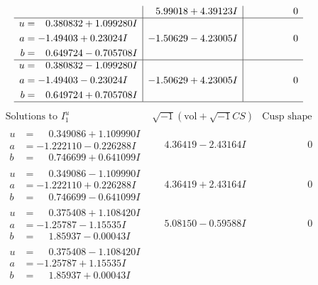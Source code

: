 \documentclass[1p]{elsarticle_modified}
\theoremstyle{definition}
\newcommand{\I}{\sqrt{-1}}
\begin{document}
$$\begin{array}{c|c|c}
 & \phantom{-}5.99018 + 4.39123 I & \phantom{-0.000000 } 0 \\ \hline\begin{aligned}
u &= \phantom{-}0.380832 + 1.099280 I \\
a &= -1.49403 + 0.23024 I \\
b &= \phantom{-}0.649724 - 0.705708 I\end{aligned}
 & -1.50629 - 4.23005 I & \phantom{-0.000000 } 0 \\ \hline\begin{aligned}
u &= \phantom{-}0.380832 - 1.099280 I \\
a &= -1.49403 - 0.23024 I \\
b &= \phantom{-}0.649724 + 0.705708 I\end{aligned}
 & -1.50629 + 4.23005 I & \phantom{-0.000000 } 0\\
 \hline 
 \end{array}$$\newpage$$\begin{array}{c|c|c}  
\text{Solutions to }I^u_{1}& \I (\text{vol} + \sqrt{-1}CS) & \text{Cusp shape}\\
 \hline 
\begin{aligned}
u &= \phantom{-}0.349086 + 1.109990 I \\
a &= -1.222110 - 0.226288 I \\
b &= \phantom{-}0.746699 + 0.641099 I\end{aligned}
 & \phantom{-}4.36419 - 2.43164 I & \phantom{-0.000000 } 0 \\ \hline\begin{aligned}
u &= \phantom{-}0.349086 - 1.109990 I \\
a &= -1.222110 + 0.226288 I \\
b &= \phantom{-}0.746699 - 0.641099 I\end{aligned}
 & \phantom{-}4.36419 + 2.43164 I & \phantom{-0.000000 } 0 \\ \hline\begin{aligned}
u &= \phantom{-}0.375408 + 1.108420 I \\
a &= -1.25787 - 1.15535 I \\
b &= \phantom{-}1.85937 - 0.00043 I\end{aligned}
 & \phantom{-}5.08150 - 0.59588 I & \phantom{-0.000000 } 0 \\ \hline\begin{aligned}
u &= \phantom{-}0.375408 - 1.108420 I \\
a &= -1.25787 + 1.15535 I \\
b &= \phantom{-}1.85937 + 0.00043 I\end{aligned}

\end{array}$$
\end{document}
